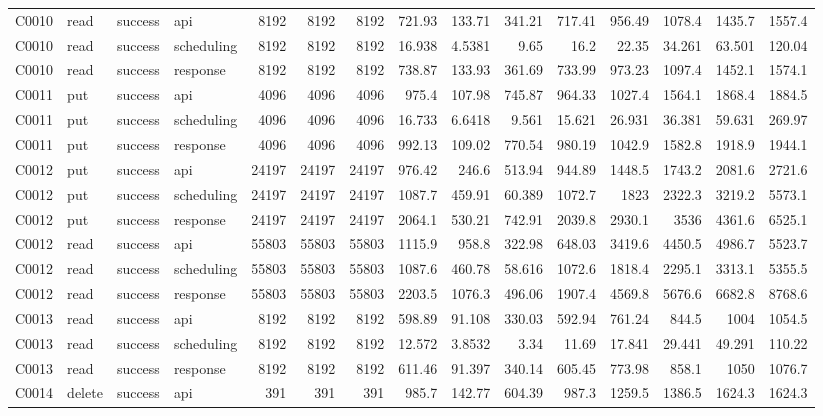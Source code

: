 \begin{landscape}
\begin{longtable}{llllrrrrrrrrrrr}
C0010 & read & success & api & 8192 & 8192 & 8192 & 721.93 & 133.71 & 341.21 & 717.41 & 956.49 & 1078.4 & 1435.7 & 1557.4\\
C0010 & read & success & scheduling & 8192 & 8192 & 8192 & 16.938 & 4.5381 & 9.65 & 16.2 & 22.35 & 34.261 & 63.501 & 120.04\\
C0010 & read & success & response & 8192 & 8192 & 8192 & 738.87 & 133.93 & 361.69 & 733.99 & 973.23 & 1097.4 & 1452.1 & 1574.1\\
C0011 & put & success & api & 4096 & 4096 & 4096 & 975.4 & 107.98 & 745.87 & 964.33 & 1027.4 & 1564.1 & 1868.4 & 1884.5\\
C0011 & put & success & scheduling & 4096 & 4096 & 4096 & 16.733 & 6.6418 & 9.561 & 15.621 & 26.931 & 36.381 & 59.631 & 269.97\\
C0011 & put & success & response & 4096 & 4096 & 4096 & 992.13 & 109.02 & 770.54 & 980.19 & 1042.9 & 1582.8 & 1918.9 & 1944.1\\
C0012 & put & success & api & 24197 & 24197 & 24197 & 976.42 & 246.6 & 513.94 & 944.89 & 1448.5 & 1743.2 & 2081.6 & 2721.6\\
C0012 & put & success & scheduling & 24197 & 24197 & 24197 & 1087.7 & 459.91 & 60.389 & 1072.7 & 1823 & 2322.3 & 3219.2 & 5573.1\\
C0012 & put & success & response & 24197 & 24197 & 24197 & 2064.1 & 530.21 & 742.91 & 2039.8 & 2930.1 & 3536 & 4361.6 & 6525.1\\
C0012 & read & success & api & 55803 & 55803 & 55803 & 1115.9 & 958.8 & 322.98 & 648.03 & 3419.6 & 4450.5 & 4986.7 & 5523.7\\
C0012 & read & success & scheduling & 55803 & 55803 & 55803 & 1087.6 & 460.78 & 58.616 & 1072.6 & 1818.4 & 2295.1 & 3313.1 & 5355.5\\
C0012 & read & success & response & 55803 & 55803 & 55803 & 2203.5 & 1076.3 & 496.06 & 1907.4 & 4569.8 & 5676.6 & 6682.8 & 8768.6\\
C0013 & read & success & api & 8192 & 8192 & 8192 & 598.89 & 91.108 & 330.03 & 592.94 & 761.24 & 844.5 & 1004 & 1054.5\\
C0013 & read & success & scheduling & 8192 & 8192 & 8192 & 12.572 & 3.8532 & 3.34 & 11.69 & 17.841 & 29.441 & 49.291 & 110.22\\
C0013 & read & success & response & 8192 & 8192 & 8192 & 611.46 & 91.397 & 340.14 & 605.45 & 773.98 & 858.1 & 1050 & 1076.7\\
C0014 & delete & success & api & 391 & 391 & 391 & 985.7 & 142.77 & 604.39 & 987.3 & 1259.5 & 1386.5 & 1624.3 & 1624.3\\

\end{longtable}
\end{landscape}
